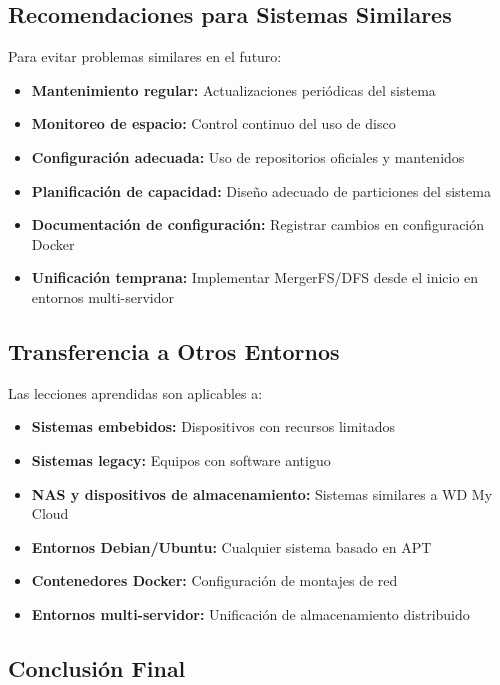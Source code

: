 \documentclass[12pt, a4paper]{article}
\begin{document}
\subsection{Recomendaciones para Sistemas Similares}
\label{subsec:recomendaciones}

Para evitar problemas similares en el futuro:

\begin{itemize}
    \item \textbf{Mantenimiento regular:} Actualizaciones periódicas del sistema
    \item \textbf{Monitoreo de espacio:} Control continuo del uso de disco
    \item \textbf{Configuración adecuada:} Uso de repositorios oficiales y mantenidos
    \item \textbf{Planificación de capacidad:} Diseño adecuado de particiones del sistema
    \item \textbf{Documentación de configuración:} Registrar cambios en configuración Docker
    \item \textbf{Unificación temprana:} Implementar MergerFS/DFS desde el inicio en entornos multi-servidor
\end{itemize}

\subsection{Transferencia a Otros Entornos}
\label{subsec:transferencia}

Las lecciones aprendidas son aplicables a:

\begin{itemize}
    \item \textbf{Sistemas embebidos:} Dispositivos con recursos limitados
    \item \textbf{Sistemas legacy:} Equipos con software antiguo
    \item \textbf{NAS y dispositivos de almacenamiento:} Sistemas similares a WD My Cloud
    \item \textbf{Entornos Debian/Ubuntu:} Cualquier sistema basado en APT
    \item \textbf{Contenedores Docker:} Configuración de montajes de red
    \item \textbf{Entornos multi-servidor:} Unificación de almacenamiento distribuido
\end{itemize}

\subsection{Conclusión Final}
\label{subsec:conclusion_final}
\end{document}
